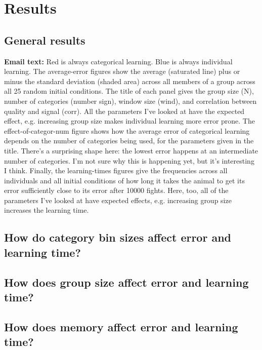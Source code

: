 \section*{Results}
\subsection*{General results}
\textbf{Email text: }Red is always categorical learning. Blue is always individual learning. The average-error figures show the average (saturated line) plus or minus the standard deviation (shaded area) across all members of a group across all 25 random initial conditions. The title of each panel gives the group size (N), number of categories (number sign), window size (wind), and correlation between quality and signal (corr). All the parameters I've looked at have the expected effect, e.g. increasing group size makes individual learning more error prone. The effect-of-categor-num figure shows how the average error of categorical learning depends on the number of categories being used, for the parameters given in the title. There's a surprising shape here: the lowest error happens at an intermediate number of categories. I'm not sure why this is happening yet, but it's interesting I think. Finally, the learning-times figures give the frequencies across all individuals and all initial conditions of how long it takes the animal to get its error sufficiently close to its error after 10000 fights. Here, too, all of the parameters I've looked at have expected effects, e.g. increasing group size increases the learning time.


\subsection*{How do category bin sizes affect error and learning time?}

\subsection*{How does group size affect error and learning time?}

\subsection*{How does memory affect error and learning time?}


